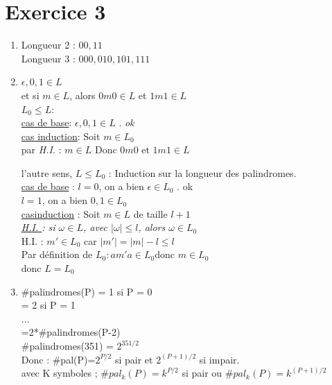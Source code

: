 \documentclass[a4paper, draft]{article}
\begin{document}
\section*{Exercice 3}
\begin{enumerate}
  \item Longueur 2 : $00,11$\\
    Longueur 3 : $000,010,101,111$\\
  \item $\epsilon ,0,1 \in L$\\
    et si $m \in L$, alors $0m0 \in L$ et $1m1 \in L$\\
    $L_{0} \leq L$:\\

    \underline{cas de base}: $\epsilon , 0,1 \in L $ . \emph{ok}\\

    \underline{cas induction}: Soit $m \in L_0$ \\
    par \emph{H.I.} : $m \in L$
    Donc $0m0 \text{ et } 1m1 \in L $

    l'autre sens, $L \leq L_{0}$ : Induction sur la longueur des palindromes.\\

    \underline{cas de base} : $l = 0$, on a bien $\epsilon \in L_{0}$ . ok\\
    $l=1$, on a bien $0,1\in L_{0}$\\

    \underline{casinduction} : Soit $m \in L$ de taille $l+1$\\
    \emph{ \underline{ H.I. } : si $\omega \in L$, avec $|\omega|\leq l$, alors $\omega \in L_{0}$}\\
    H.I. : $m' \in L_0$ car $|m'| = |m| - l \leq l$\\
    Par définition de $L_{0} : am'a \in L_{0} $donc $m \in L_{0}$\\
    donc $L = L_{0}$\\

  \item \#palindromes(P) = 1 si P = 0\\
    = 2 si P = 1\\
    ...\\
    =2*\#palindromes(P-2)\\

    \#palindromes(351) = $2^{351/2}$\\
    Donc : \#pal(P)=$2^{P/2}$ si pair et $2^{(P+1)/2}$ si impair.\\
    avec K symboles ; $\# pal_k(P)=k^{P/2}$ si pair ou $\# pal_{k}(P)=k^{(P+1)/2}$\\
\end{enumerate}
\end{document}
